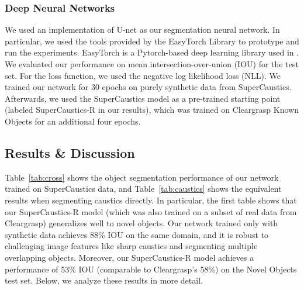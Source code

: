 \documentclass[conference]{IEEEtran}
\begin{document}
\subsubsection{Deep Neural Networks} We used an implementation of U-net \cite{unet} as our segmentation neural network. In particular, we used the tools provided by the EasyTorch Library to prototype and run the experiments. EasyTorch is a Pytorch-based deep learning library used in \cite{easytorch,10.3389/fcomp.2020.00035,motevali}. We evaluated our performance on mean intersection-over-union (IOU) for the test set. For the loss function, we used the negative log likelihood loss (NLL). We trained our network for 30 epochs on purely synthetic data from SuperCaustics. Afterwards, we used the SuperCaustics model as a pre-trained starting point (labeled SuperCaustics-R in our results), which was trained on Cleargrasp Known Objects for an additional four epochs. 

\begin{table*}[]
\centering
\caption{Caustics Segmentation}
\label{tab:caustics}
\end{table*}

\subsection{Results \& Discussion}
Table~\ref{tab:cross} shows the object segmentation performance of our network trained on SuperCaustics data, and Table~\ref{tab:caustics} shows the equivalent results when segmenting caustics directly. In particular, the first table shows that our SuperCaustics-R model (which was also trained on a subset of real data from Cleargrasp) generalizes well to novel objects. Our network trained only with synthetic data achieves 88\% IOU on the same domain, and it is robust to challenging image features like sharp caustics and segmenting multiple overlapping objects. Moreover, our SuperCaustics-R model achieves a performance of 53\% IOU (comparable to Cleargrasp's 58\%) on the Novel Objects test set. Below, we analyze these results in more detail.
\end{document}
